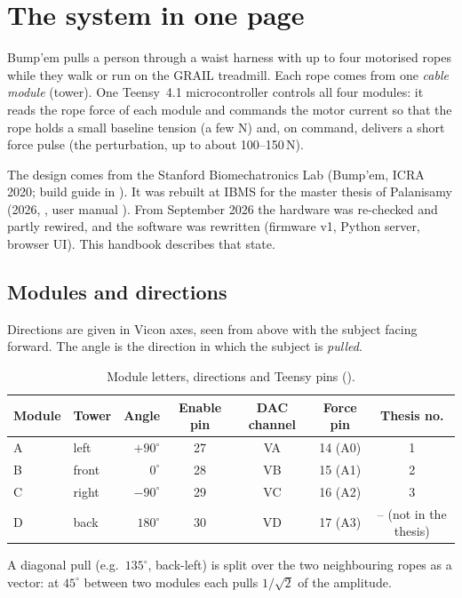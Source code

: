 \section{The system in one page}

Bump'em pulls a person through a waist harness with up to four motorised ropes while they walk or run
on the GRAIL treadmill. Each rope comes from one \emph{cable module} (tower). One Teensy~4.1
microcontroller controls all four modules: it reads the rope force of each module and commands the motor
current so that the rope holds a small baseline tension (a few N) and, on command, delivers a short force
pulse (the perturbation, up to about 100--150\,N).

The design comes from the Stanford Biomechatronics Lab (Bump'em, ICRA 2020; build guide in
). It was rebuilt at IBMS for the master thesis of
Palanisamy (2026, , user manual ). From
September 2026 the hardware was re-checked and partly rewired, and the software was rewritten
(firmware v1, Python server, browser UI). This handbook describes that state.

\subsection{Modules and directions}
Directions are given in Vicon axes, seen from above with the subject facing forward. The angle is the
direction in which the subject is \emph{pulled}.

\begin{table}[H]\centering
\begin{tabular}{llrcccc}
\toprule
Module & Tower & Angle & Enable pin & DAC channel & Force pin & Thesis no. \\
\midrule
A & left  & $+90^\circ$  & 27 & VA & 14 (A0) & 1 \\
B & front & $0^\circ$    & 28 & VB & 15 (A1) & 2 \\
C & right & $-90^\circ$  & 29 & VC & 16 (A2) & 3 \\
D & back  & $180^\circ$  & 30 & VD & 17 (A3) & -- (not in the thesis) \\
\bottomrule
\end{tabular}
\caption{Module letters, directions and Teensy pins ().}
\end{table}

A diagonal pull (e.g.\ $135^\circ$, back-left) is split over the two neighbouring ropes as a vector:
at $45^\circ$ between two modules each pulls $1/\sqrt{2}$ of the amplitude.

